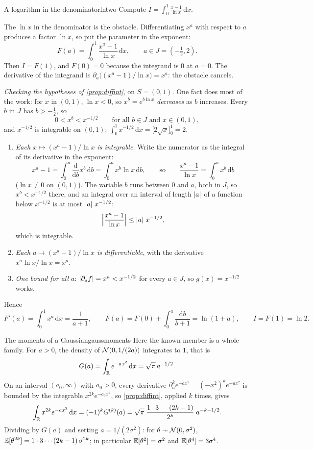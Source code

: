 \begin{example}{A logarithm in the denominator}{lntwo}
Compute $I=\int_0^1\frac{x-1}{\ln x}\,\mathrm dx$.

The $\ln x$ in the denominator is the obstacle. Differentiating $x^a$
with respect to $a$ produces a factor $\ln x$, so put the parameter in
the exponent:
\[
  F(a)=\int_0^1\frac{x^a-1}{\ln x}\,\mathrm dx ,\qquad a\in J=(-\tfrac12,2).
\]
Then $I=F(1)$, and $F(0)=0$ because the integrand is $0$ at $a=0$.
The derivative of the integrand is
$\partial_a\bigl((x^a-1)/\ln x\bigr)=x^a$: the obstacle cancels.

\emph{Checking the hypotheses of \cref{prop:diffint}}, on $S=(0,1)$.
One fact does most of the work: for $x$ in $(0,1)$, $\ln x<0$, so
$x^b=e^{b\ln x}$ \emph{decreases} as $b$ increases. Every $b$ in $J$ has
$b>-\tfrac12$, so
\[
  0<x^b<x^{-1/2}\qquad\text{for all }b\in J\text{ and }x\in(0,1),
\]
and $x^{-1/2}$ is integrable on $(0,1)$:
$\int_0^1x^{-1/2}\,\mathrm dx=\bigl[2\sqrt x\bigr]_0^1=2$.
\begin{enumerate}[nosep]
  \item[(1)] \emph{Each $x\mapsto(x^a-1)/\ln x$ is integrable.} Write the
        numerator as the integral of its derivative in the exponent:
        \[
          x^a-1=\int_0^a\frac{\mathrm d}{\mathrm db}x^b\,\mathrm db
          =\int_0^ax^b\ln x\,\mathrm db,
          \qquad\text{so}\qquad
          \frac{x^a-1}{\ln x}=\int_0^ax^b\,\mathrm db
        \]
        ($\ln x\neq0$ on $(0,1)$). The variable $b$ runs between $0$
        and $a$, both in $J$, so $x^b<x^{-1/2}$ there, and an integral
        over an interval of length $\left\lvert a\right\rvert$ of a function below
        $x^{-1/2}$ is at most $\left\lvert a\right\rvert\,x^{-1/2}$:
        \[
          \Bigl|\frac{x^a-1}{\ln x}\Bigr|\le\left\lvert a\right\rvert\,x^{-1/2},
        \]
        which is integrable.
  \item[(2)] \emph{Each $a\mapsto(x^a-1)/\ln x$ is differentiable}, with
        the derivative $x^a\ln x/\ln x=x^a$.
  \item[(3)] \emph{One bound for all $a$}: $\left\lvert \partial_af\right\rvert=x^a<x^{-1/2}$
        for every $a\in J$, so $g(x)=x^{-1/2}$ works.
\end{enumerate}
Hence
\[
  F'(a)=\int_0^1x^a\,\mathrm dx=\frac1{a+1},
  \qquad
  F(a)=F(0)+\int_0^a\frac{\mathrm db}{b+1}=\ln(1+a),
  \qquad
  I=F(1)=\ln2 .
\]
\end{example}

\begin{example}{The moments of a Gaussian}{gaussmoments}
Here the known member is a whole family. For $a>0$, the density of
$\mathcal{N}(0,1/(2a))$ integrates to $1$, that is
\[
  G(a)=\int_{\mathbb{R}} e^{-ax^2}\,\mathrm dx=\sqrt{\pi}\,a^{-1/2}.
\]
On an interval $(a_0,\infty)$ with $a_0>0$, every derivative
$\partial_a^k e^{-ax^2}=(-x^2)^ke^{-ax^2}$ is bounded by the integrable
$x^{2k}e^{-a_0x^2}$, so \cref{prop:diffint}, applied $k$ times, gives
\[
  \int_{\mathbb{R}} x^{2k}e^{-ax^2}\,\mathrm dx=(-1)^kG^{(k)}(a)
  =\sqrt\pi\;\frac{1\cdot3\cdots(2k-1)}{2^k}\;a^{-k-1/2}.
\]
Dividing by $G(a)$ and setting $a=1/(2\sigma^2)$: for
$\theta\sim\mathcal{N}(0,\sigma^2)$,
$\mathbb{E}[\theta^{2k}]=1\cdot3\cdots(2k-1)\,\sigma^{2k}$; in particular
$\mathbb{E}[\theta^2]=\sigma^2$ and $\mathbb{E}[\theta^4]=3\sigma^4$.
\end{example}

